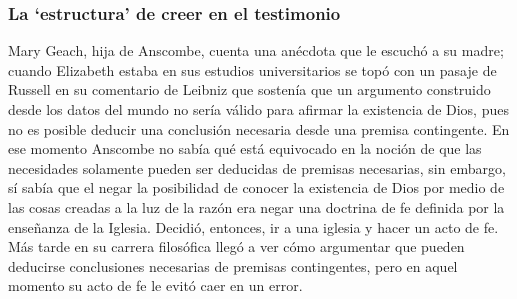 \subsubsection{La `estructura' de creer en el testimonio}

Mary Geach, hija de Anscombe, cuenta una anécdota que le escuchó a su madre; cuando Elizabeth estaba en sus estudios universitarios se topó con un pasaje de Russell en su comentario de Leibniz que sostenía que un argumento construido desde los datos del mundo no sería válido para afirmar la existencia de Dios, pues no es posible deducir una conclusión necesaria desde una premisa contingente. En ese momento Anscombe no sabía qué está equivocado en la noción de que las necesidades solamente pueden ser deducidas de premisas necesarias, sin embargo, sí sabía que el negar la posibilidad de conocer la existencia de Dios por medio de las cosas creadas a la luz de la razón era negar una doctrina de fe definida por la enseñanza de la Iglesia. Decidió, entonces, ir a una iglesia y hacer un acto de fe. Más tarde en su carrera filosófica llegó a ver cómo argumentar que pueden deducirse conclusiones necesarias de premisas contingentes, pero en aquel momento su acto de fe le evitó caer en un error.

